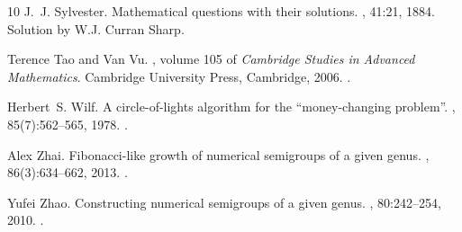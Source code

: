 \begin{thebibliography}{10}
J.~J. Sylvester.
\newblock Mathematical questions with their solutions.
, 41:21, 1884.
\newblock Solution by W.J. Curran Sharp.

Terence Tao and Van Vu.
, volume 105 of {\em Cambridge Studies in
  Advanced Mathematics}.
\newblock Cambridge University Press, Cambridge, 2006.
\newblock \href {http://dx.doi.org/10.1017/CBO9780511755149}
  {}.

Herbert~S. Wilf.
\newblock A circle-of-lights algorithm for the ``money-changing problem''.
, 85(7):562--565, 1978.
\newblock \href {http://dx.doi.org/10.2307/2320864} {}.

Alex Zhai.
\newblock Fibonacci-like growth of numerical semigroups of a given genus.
, 86(3):634--662, 2013.
\newblock \href {http://dx.doi.org/10.1007/s00233-012-9456-5}
  {}.

Yufei Zhao.
\newblock Constructing numerical semigroups of a given genus.
, 80:242--254, 2010.
\newblock \href {http://dx.doi.org/10.1007/s00233-009-9190-9}
  {}.

\end{thebibliography}
